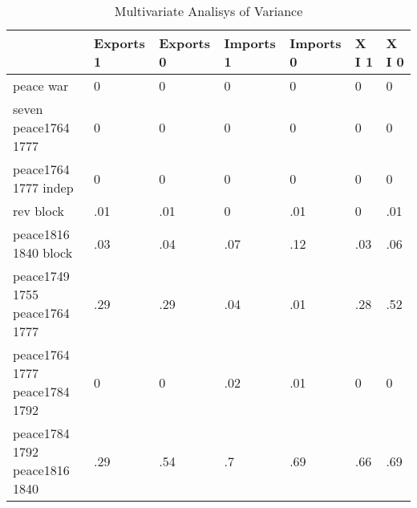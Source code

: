 \begin{table}[htbp]
\caption{\label{manova_test} Multivariate Analisys of Variance}\centering\medskip
\begin{tabular}{|l|l|l|l|l|l|l|}\hline  
 & Exports 1  & Exports 0  & Imports 1  & Imports 0  & X I 1  & X I 0  \\ \hline  
peace war & 0 & 0 & 0 & 0 & 0 & 0 \\ \hline 
seven peace1764 1777 & 0 & 0 & 0 & 0 & 0 & 0 \\ \hline 
peace1764 1777 indep & 0 & 0 & 0 & 0 & 0 & 0 \\ \hline 
rev block & .01 & .01 & 0 & .01 & 0 & .01 \\ \hline 
peace1816 1840 block & .03 & .04 & .07 & .12 & .03 & .06 \\ \hline 
peace1749 1755 peace1764 1777 & .29 & .29 & .04 & .01 & .28 & .52 \\ \hline 
peace1764 1777 peace1784 1792 & 0 & 0 & .02 & .01 & 0 & 0 \\ \hline 
peace1784 1792 peace1816 1840 & .29 & .54 & .7 & .69 & .66 & .69 \\ \hline 
  \end{tabular}
\end{table}
